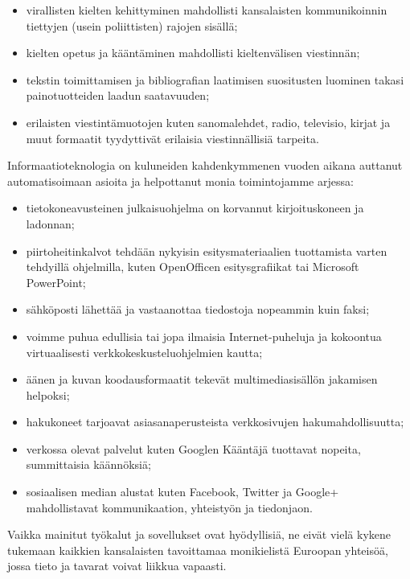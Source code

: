 \documentclass{../../metanetpaper}
\begin{document}
\begin{Parallel}[c]{79mm}{78mm}
{\begin{itemize}
\item virallisten kielten kehittyminen mahdollisti kansalaisten kommunikoinnin
tiettyjen (usein poliittisten) rajojen sisällä;

\item kielten opetus ja kääntäminen mahdollisti kieltenvälisen viestinnän;

\item tekstin toimittamisen ja bibliografian laatimisen suositusten luominen takasi
painotuotteiden laadun saatavuuden;

\item erilaisten viestintämuotojen kuten sanomalehdet, radio, televisio, kirjat ja
muut formaatit tyydyttivät erilaisia viestinnällisiä tarpeita.
\end{itemize}
Informaatioteknologia on kuluneiden kahdenkymmenen vuoden aikana auttanut
automatisoimaan asioita ja helpottanut monia toimintojamme arjessa:
\begin{itemize}
\item tietokoneavusteinen julkaisuohjelma on korvannut kirjoituskoneen ja ladonnan;

\item piirtoheitinkalvot tehdään nykyisin esitysmateriaalien
tuottamista varten tehdyillä ohjelmilla, kuten
\foreignlanguage{english}{OpenOfficen} esitysgrafiikat tai Microsoft
PowerPoint;

\item sähköposti lähettää ja vastaanottaa tiedostoja nopeammin kuin faksi;

\item voimme puhua edullisia tai jopa ilmaisia Internet-puheluja ja kokoontua
virtuaalisesti verkkokeskusteluohjelmien kautta;

\item äänen ja kuvan koodausformaatit tekevät multimediasisällön jakamisen helpoksi;

\item hakukoneet tarjoavat asiasanaperusteista verkkosivujen hakumahdollisuutta;

\item verkossa olevat palvelut kuten Googlen Kääntäjä tuottavat nopeita, summittaisia
käännöksiä;

\item sosiaalisen median alustat kuten Facebook, Twitter ja Google+ mahdollistavat
kommunikaation, yhteistyön ja tiedonjaon.
\end{itemize}
Vaikka mainitut työkalut ja sovellukset ovat hyödyllisiä, ne eivät vielä kykene
tukemaan kaikkien kansalaisten tavoittamaa monikielistä Euroopan yhteisöä,
jossa tieto ja tavarat voivat liikkua vapaasti.
}


\end{Parallel}
\end{document}
